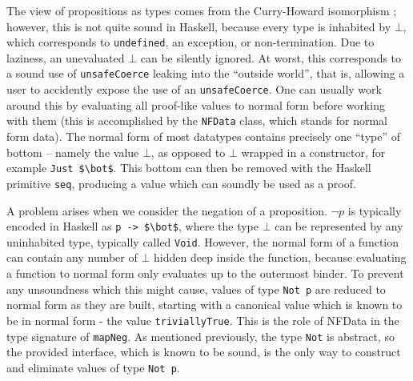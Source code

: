                     The view of propositions as types comes from the 
                    Curry-Howard
                    isomorphism \cite{props}; however, this is not quite sound 
                    in Haskell, because
                    every type is inhabited by $\bot$, which corresponds to 
                    \texttt{undefined}, an
                    exception, or non-termination. Due to laziness, an 
                    unevaluated $\bot$ can be
                    silently ignored. At worst, this corresponds to a sound use 
                    of
                    \lstinline{unsafeCoerce} leaking into the ``outside 
                    world'', that is, allowing
                    a user to accidently expose the use of an 
                    \lstinline{unsafeCoerce}. One can
                    usually work around this by evaluating all proof-like 
                    values to normal form
                    before working with them (this is accomplished by the 
                    \lstinline{NFData} class,
                    which stands for normal form data). The normal form of most 
                    datatypes contains
                    precisely one ``type'' of bottom -- namely the value 
                    $\bot$, as opposed to
                    $\bot$ wrapped in a constructor, for example 
                    \lstinline{Just $\bot$}. This
                    bottom can then be removed with the Haskell primitive 
                    \lstinline{seq},
                    producing a value which can soundly be used as a proof.
                    
                    A problem arises when we consider the negation of a 
                    proposition. $\lnot p$ is
                    typically encoded in Haskell as \lstinline{p -> $\bot$}, 
                    where the type $\bot$
                    can be represented by any uninhabited type, typically called
                    \lstinline{Void}. However, the normal form of a function 
                    can contain any number
                    of $\bot$ hidden deep inside the function, because 
                    evaluating a function to
                    normal form only evaluates up to the outermost binder.  To 
                    prevent any
                    unsoundness which this might cause, values of type 
                    \lstinline{Not p} are reduced
                    to normal form as they are built, starting with a canonical 
                    value which is known
                    to be in normal form - the value 
                    \lstinline{triviallyTrue}.  This is the role of
                    NFData in the type signature of \lstinline{mapNeg}.  As 
                    mentioned previously,
                    the type \lstinline{Not} is abstract, so the provided 
                    interface, which is known
                    to be sound, is the only way to construct and eliminate 
                    values of type
                    \lstinline{Not p}.
                    
